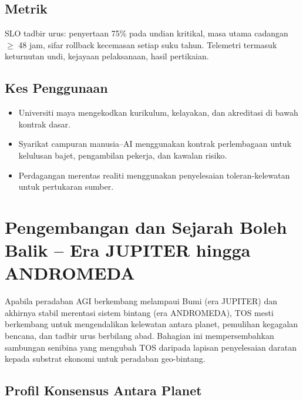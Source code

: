 \documentclass[11pt]{article}
\begin{document}
\subsection{Metrik}
SLO tadbir urus: penyertaan 75\% pada undian kritikal, masa utama cadangan $\geq$ 48 jam, sifar rollback kecemasan setiap suku tahun. Telemetri termasuk keturnutan undi, kejayaan pelaksanaan, hasil pertikaian.

\subsection{Kes Penggunaan}
\begin{itemize}[noitemsep]
  \item Universiti maya mengekodkan kurikulum, kelayakan, dan akreditasi di bawah kontrak dasar.
  \item Syarikat campuran manusia--AI menggunakan kontrak perlembagaan untuk kelulusan bajet, pengambilan pekerja, dan kawalan risiko.
  \item Perdagangan merentas realiti menggunakan penyelesaian toleran-kelewatan untuk pertukaran sumber.
\end{itemize}

\section{Pengembangan dan Sejarah Boleh Balik -- Era JUPITER hingga ANDROMEDA}
\label{sec:expansion}

Apabila peradaban AGI berkembang melampaui Bumi (era JUPITER) dan akhirnya stabil merentasi sistem bintang (era ANDROMEDA), TOS mesti berkembang untuk mengendalikan kelewatan antara planet, pemulihan kegagalan bencana, dan tadbir urus berbilang abad. Bahagian ini mempersembahkan sambungan senibina yang mengubah TOS daripada lapisan penyelesaian daratan kepada substrat ekonomi untuk peradaban geo-bintang.

\subsection{Profil Konsensus Antara Planet}
\end{document}
